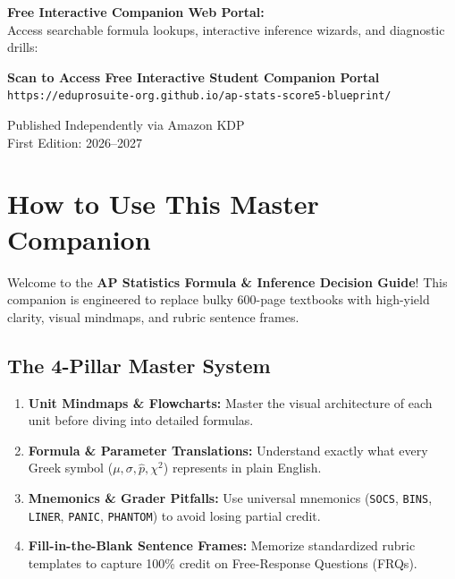 \documentclass[11pt,oneside,openany]{book}
\newcommand{\BookTitle}{AP Statistics Formula \& Inference Decision Guide}
\begin{document}
\vspace{0.15in}

\noindent \textbf{Free Interactive Companion Web Portal:}\\
Access searchable formula lookups, interactive inference wizards, and diagnostic drills:

\begin{center}
    \vspace{0.06in}
    
    \vspace{0.05in}
    {\footnotesize\textbf{\textsf{Scan to Access Free Interactive Student Companion Portal}}}\\
    {\scriptsize\texttt{https://eduprosuite-org.github.io/ap-stats-score5-blueprint/}}
\end{center}

\vspace{0.1in}
\noindent Published Independently via Amazon KDP\\
First Edition: 2026--2027

\chapter*{How to Use This Master Companion}

Welcome to the \textbf{\BookTitle}! This companion is engineered to replace bulky 600-page textbooks with high-yield clarity, visual mindmaps, and rubric sentence frames.

\section*{The 4-Pillar Master System}
\begin{enumerate}[label=\textbf{Pillar \arabic*:}, leftmargin=*]
    \item \textbf{Unit Mindmaps \& Flowcharts:} Master the visual architecture of each unit before diving into detailed formulas.
    \item \textbf{Formula \& Parameter Translations:} Understand exactly what every Greek symbol ($\mu, \sigma, \hat{p}, \chi^2$) represents in plain English.
    \item \textbf{Mnemonics \& Grader Pitfalls:} Use universal mnemonics (\texttt{SOCS}, \texttt{BINS}, \texttt{LINER}, \texttt{PANIC}, \texttt{PHANTOM}) to avoid losing partial credit.
    \item \textbf{Fill-in-the-Blank Sentence Frames:} Memorize standardized rubric templates to capture 100\% credit on Free-Response Questions (FRQs).
\end{enumerate}
\end{document}
